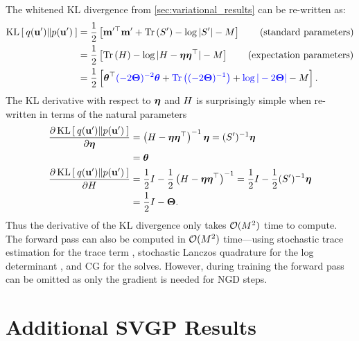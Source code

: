 The whitened KL divergence from \cref{sec:variational_results} can be re-written as:
%
\begin{align}
  \kl{ q(\bu') }{ p(\bu') }
  &= \frac{1}{2} \left[ \bmm^{\prime \top} \bmm' + \tr{ \bS' } - \log \vert \bS' \vert - M \right]
  \tag{standard parameters} \\
  &= \frac{1}{2} \left[ \tr{ \bEta } - \log \vert \bEta - \boeta \boeta^\top \vert - M \right]
  \tag{expectation parameters} \\
  &= \frac{1}{2} \left[ \btheta^\top {\color{blue} (-2 \bTheta)^{-2} \btheta} + {\color{blue} \tr{(-2 \bTheta)^{-1}}} + {\color{blue} \log \vert -2 \bTheta \vert} - M \right]
  \label{eqn:kl_natural}.
\end{align}
%
The KL derivative with respect to $\boldsymbol{\eta}$ and $H$ is surprisingly simple when re-written in terms of the natural parameters
%
\begin{align}
  \frac{\partial \operatorname*{KL} \left[ \:  q(\mathbf{u}')  \Vert  p(\mathbf{u}')  \: \right]}{ \partial \boldsymbol{\eta} }
  &= \left( H - \boldsymbol{\eta} \boldsymbol{\eta}^\top \right)^{-1} \boldsymbol{\eta}
  = (S')^{-1} \boldsymbol{\eta}
  \nonumber \\
  &= \boldsymbol{\theta}
  \label{eqn:kl_mean_deriv}
  \\
  \frac{\partial \operatorname*{KL} \left[ \:  q(\mathbf{u}')  \Vert  p(\mathbf{u}')  \: \right]}{ \partial H }
  &= \frac 1 2 I - \frac 1 2 \left( H - \boldsymbol{\eta} \boldsymbol{\eta}^\top \right)^{-1}
  = \frac 1 2 I - \frac 1 2 (S')^{-1} \boldsymbol{\eta}
  \nonumber \\
  &= \frac 1 2 I - \boldsymbol{\Theta}.
  \label{eqn:kl_covar_deriv}
\end{align}
%
Thus the derivative of the KL divergence only takes $\bigo{M^2}$ time to compute.
The forward pass can also be computed in $\bigo{M^2}$ time---using stochastic trace estimation for the trace term \citep{cutajar2016preconditioning,gardner2018gpytorch}, stochastic Lanczos quadrature for the log determinant \citep{ubaru2017fast,dong2017scalable}, and CG for the solves.
However, during training the forward pass can be omitted as only the gradient is needed for NGD steps.







\section{Additional SVGP Results}

